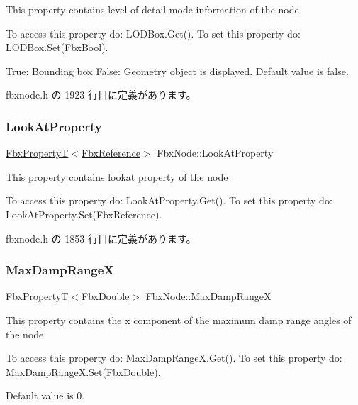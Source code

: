 This property contains level of detail mode information of the node

To access this property do\+: L\+O\+D\+Box.\+Get(). To set this property do\+: L\+O\+D\+Box.\+Set(\+Fbx\+Bool).

True\+: Bounding box False\+: Geometry object is displayed. Default value is false. 

 fbxnode.\+h の 1923 行目に定義があります。

\mbox{\label{class_fbx_node_a58a10b7beeedd498ccec72c33fa66079}} 
\subsubsection{\texorpdfstring{Look\+At\+Property}{LookAtProperty}}
{\footnotesize\ttfamily \hyperlink{class_fbx_property_t}{Fbx\+PropertyT}$<$\hyperlink{fbxtypes_8h_a44df6a2eec915cf27cd481e5c5e48a24}{Fbx\+Reference}$>$ Fbx\+Node\+::\+Look\+At\+Property}

This property contains lookat property of the node

To access this property do\+: Look\+At\+Property.\+Get(). To set this property do\+: Look\+At\+Property.\+Set(\+Fbx\+Reference). 

 fbxnode.\+h の 1853 行目に定義があります。

\mbox{\label{class_fbx_node_acff786d9903523e46826fbdf9cbb5389}} 
\subsubsection{\texorpdfstring{Max\+Damp\+RangeX}{MaxDampRangeX}}
{\footnotesize\ttfamily \hyperlink{class_fbx_property_t}{Fbx\+PropertyT}$<$\hyperlink{fbxtypes_8h_a171e72a1c46fc15c1a6c9c31948c1c5b}{Fbx\+Double}$>$ Fbx\+Node\+::\+Max\+Damp\+RangeX}

This property contains the x component of the maximum damp range angles of the node

To access this property do\+: Max\+Damp\+Range\+X.\+Get(). To set this property do\+: Max\+Damp\+Range\+X.\+Set(\+Fbx\+Double).

Default value is 0. 

